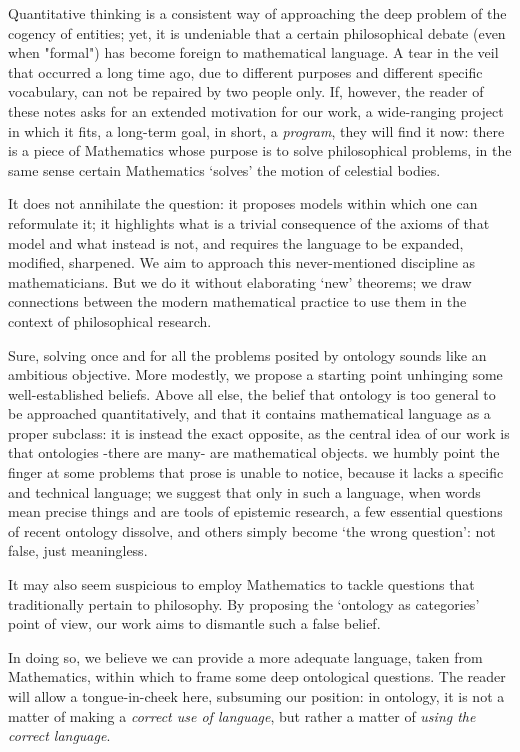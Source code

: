 Quantitative thinking is a consistent way of approaching the deep problem of the cogency of entities; yet, it is undeniable that a certain philosophical debate (even when "formal") has become foreign to mathematical language. A tear in the veil that occurred a long time ago, due to different purposes and different specific vocabulary, can not be repaired by two people only. If, however, the reader of these notes asks for an extended motivation for our work, a wide-ranging project in which it fits, a long-term goal, in short, a \emph{program}, they will find it now: there is a piece of Mathematics whose purpose is to solve philosophical problems, in the same sense certain Mathematics `solves' the motion of celestial bodies.

It does not annihilate the question: it proposes models within which one can reformulate it; it highlights what is a trivial consequence of the axioms of that model and what instead is not, and requires the language to be expanded, modified, sharpened. We aim to approach this never-mentioned discipline as mathematicians. But we do it without elaborating `new' theorems; we draw connections between the modern mathematical practice to use them in the context of philosophical research.

Sure, solving once and for all the problems posited by ontology sounds like an ambitious objective. More modestly, we propose a starting point unhinging some well-established beliefs. Above all else, the belief that ontology is too general to be approached quantitatively, and that it contains mathematical language as a proper subclass: it is instead the exact opposite, as the central idea of our work is that ontologies -there are many- are mathematical objects. we humbly point the finger at some problems that prose is unable to notice, because it lacks a specific and technical language; we suggest that only in such a language, when words mean precise things and are tools of epistemic research, a few essential questions of recent ontology dissolve, and others simply become `the wrong question': not false, just meaningless.



It may also seem suspicious to employ Mathematics to tackle questions that traditionally pertain to philosophy. By proposing the `ontology as categories' point of view, our work aims to dismantle such a false belief.%

In doing so, we believe we can provide a more adequate language, taken from Mathematics, within which to frame some deep ontological questions. The reader will allow a tongue-in-cheek here, subsuming our position: in ontology, it is not a matter of making a \emph{correct use of language}, but rather a matter of \emph{using the correct language}.

